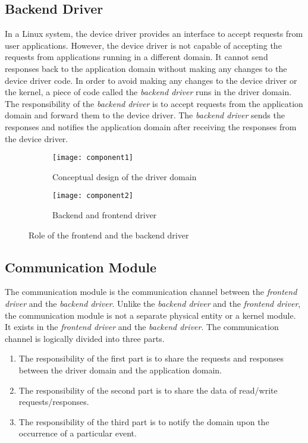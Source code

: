\subsection{Backend Driver}
\label{subsec:backend}
In a Linux system, the device driver provides an interface to accept requests from user applications. However, the device driver is not capable of accepting the requests from applications running in a different domain. It cannot send responses back to the application domain without making any changes to the device driver code. In order to avoid making any changes to the device driver or the kernel, a piece of code called the \textit{backend driver} runs in the driver domain. The responsibility of the \textit{backend driver} is to accept requests from the application domain and forward them to the device driver. The \textit{backend driver} sends the responses and notifies the application domain after receiving the responses from the device driver.
\begin{figure}[!ht]
    \centering
    \begin{subfigure}[b]{0.45\textwidth}
	\texttt{[image: component1]}
	\caption{Conceptual design of the driver domain}
	\label{fig:conept}
    \end{subfigure}
	\hfill
    \begin{subfigure}[b]{0.45\textwidth}
	\texttt{[image: component2]}
	\caption{Backend and frontend driver}
	\label{fig:backendfrontend}
    \end{subfigure}
    \caption{Role of the frontend and the backend driver}\label{fig:fault tolerence}
\end{figure}

\subsection{Communication Module}
\label{sub:communicationmodule}
The communication module is the communication channel between the \textit{frontend driver} and the \textit{backend driver}. Unlike the \textit{backend driver} and the \textit{frontend driver}, the communication module is not a separate physical entity or a kernel module. It exists in the \textit{frontend driver} and the \textit{backend driver}. The communication channel is logically divided into three parts. 
\begin{enumerate} 
\item The responsibility of the first part is to share the requests and responses between the driver domain and the application domain.
\item The responsibility of the second part is to share the data of read/write requests/responses.
\item The responsibility of the third part is to notify the domain upon the occurrence of a particular event. 
\end{enumerate}

